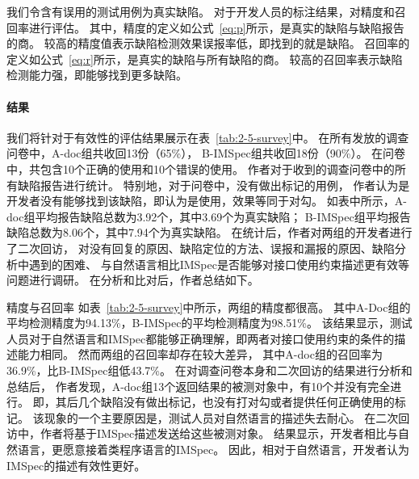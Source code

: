 我们令含有误用的测试用例为真实缺陷。
对于开发人员的标注结果，对精度和召回率进行评估。
其中，精度的定义如公式~\ref{eq:p}所示，是真实的缺陷与缺陷报告的商。
较高的精度值表示缺陷检测效果误报率低，即找到的就是缺陷。
召回率的定义如公式~\ref{eq:r}所示，是真实的缺陷与所有缺陷的商。
较高的召回率表示缺陷检测能力强，即能够找到更多缺陷。




\paragraph{结果}
我们将针对于有效性的评估结果展示在表~\ref{tab:2-5-survey}中。
在所有发放的调查问卷中，A-doc组共收回13份（65\%），
B-IMSpec组共收回18份（90\%）。
在问卷中，共包含10个正确的使用和10个错误的使用。
作者对于收到的调查问卷中的所有缺陷报告进行统计。
特别地，对于问卷中，没有做出标记的用例，
作者认为是开发者没有能够找到该缺陷，即认为是使用，效果等同于对勾。
如表中所示，A-doc组平均报告缺陷总数为3.92个，其中3.69个为真实缺陷；
B-IMSpec组平均报告缺陷总数为8.06个，其中7.94个为真实缺陷。
在统计后，作者对两组的开发者进行了二次回访，
对没有回复的原因、缺陷定位的方法、误报和漏报的原因、缺陷分析中遇到的困难、
与自然语言相比IMSpec是否能够对接口使用约束描述更有效等问题进行调研。
在分析和比对后，作者总结如下。

{\kaishu 精度与召回率 }
如表~\ref{tab:2-5-survey}中所示，两组的精度都很高。
其中A-Doc组的平均检测精度为94.13\%，B-IMSpec的平均检测精度为98.51\%。
该结果显示，测试人员对于自然语言和IMSpec都能够正确理解，即两者对接口使用约束的条件的描述能力相同。
然而两组的召回率却存在较大差异，
其中A-doc组的召回率为36.9\%，比B-IMSpec组低43.7\%。
在对调查问卷本身和二次回访的结果进行分析和总结后，
作者发现，A-doc组13个返回结果的被测对象中，有10个并没有完全进行。
即，其后几个缺陷没有做出标记，也没有打对勾或者提供任何正确使用的标记。
该现象的一个主要原因是，测试人员对自然语言的描述失去耐心。
在二次回访中，作者将基于IMSpec描述发送给这些被测对象。
结果显示，开发者相比与自然语言，更愿意接着类程序语言的IMSpec。
因此，相对于自然语言，开发者认为IMSpec的描述有效性更好。
	
